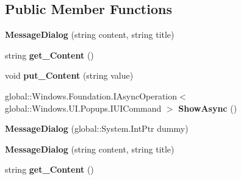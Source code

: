 \subsection*{Public Member Functions}
\begin{DoxyCompactItemize}
\item 
\mbox{\label{class_windows_1_1_u_i_1_1_popups_1_1_message_dialog_a6e6261d06149819ffae64bd6cf844452}} 
{\bfseries Message\+Dialog} (string content, string title)
\item 
\mbox{\label{class_windows_1_1_u_i_1_1_popups_1_1_message_dialog_a5dfca1b3a2d32d5796ee862e6ce6d463}} 
string {\bfseries get\+\_\+\+Content} ()
\item 
\mbox{\label{class_windows_1_1_u_i_1_1_popups_1_1_message_dialog_acbe1e51198d51c884324ef14c8eb18fd}} 
void {\bfseries put\+\_\+\+Content} (string value)
\item 
\mbox{\label{class_windows_1_1_u_i_1_1_popups_1_1_message_dialog_a8e63c5ddb4030ceeb6e297828c9c9e8b}} 
global\+::\+Windows.\+Foundation.\+I\+Async\+Operation$<$ global\+::\+Windows.\+U\+I.\+Popups.\+I\+U\+I\+Command $>$ {\bfseries Show\+Async} ()
\item 
\mbox{\label{class_windows_1_1_u_i_1_1_popups_1_1_message_dialog_a3f82d7d935a9d6b254124727d7e3c793}} 
{\bfseries Message\+Dialog} (global\+::\+System.\+Int\+Ptr dummy)
\item 
\mbox{\label{class_windows_1_1_u_i_1_1_popups_1_1_message_dialog_a6e6261d06149819ffae64bd6cf844452}} 
{\bfseries Message\+Dialog} (string content, string title)
\item 
\mbox{\label{class_windows_1_1_u_i_1_1_popups_1_1_message_dialog_a5dfca1b3a2d32d5796ee862e6ce6d463}} 
string {\bfseries get\+\_\+\+Content} ()
\item 
\mbox{\label{class_windows_1_1_u_i_1_1_popups_1_1_message_dialog_acbe1e51198d51c884324ef14c8eb18fd}} 

\end{DoxyCompactItemize}
